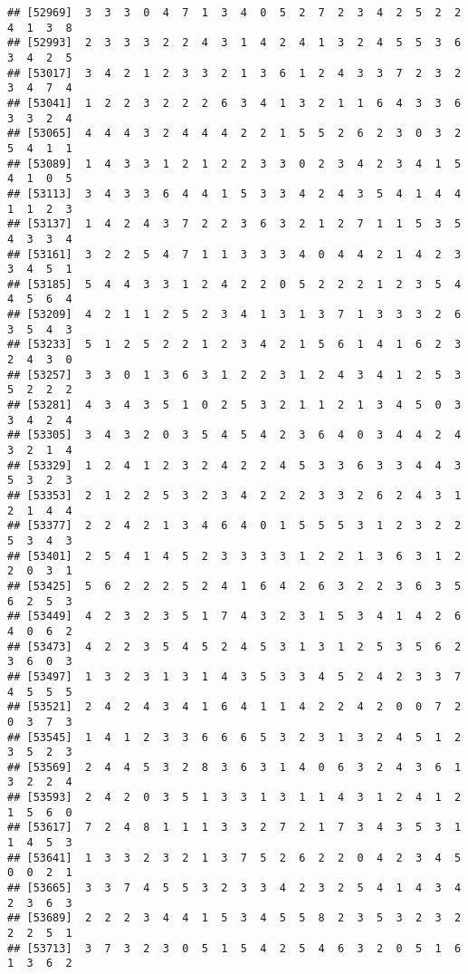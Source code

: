 \documentclass[
]{article}
\begin{document}
\begin{verbatim}
## [52969]  3  3  3  0  4  7  1  3  4  0  5  2  7  2  3  4  2  5  2  2  4  1  3  8
## [52993]  2  3  3  3  2  2  4  3  1  4  2  4  1  3  2  4  5  5  3  6  3  4  2  5
## [53017]  3  4  2  1  2  3  3  2  1  3  6  1  2  4  3  3  7  2  3  2  3  4  7  4
## [53041]  1  2  2  3  2  2  2  6  3  4  1  3  2  1  1  6  4  3  3  6  3  3  2  4
## [53065]  4  4  4  3  2  4  4  4  2  2  1  5  5  2  6  2  3  0  3  2  5  4  1  1
## [53089]  1  4  3  3  1  2  1  2  2  3  3  0  2  3  4  2  3  4  1  5  4  1  0  5
## [53113]  3  4  3  3  6  4  4  1  5  3  3  4  2  4  3  5  4  1  4  4  1  1  2  3
## [53137]  1  4  2  4  3  7  2  2  3  6  3  2  1  2  7  1  1  5  3  5  4  3  3  4
## [53161]  3  2  2  5  4  7  1  1  3  3  3  4  0  4  4  2  1  4  2  3  3  4  5  1
## [53185]  5  4  4  3  3  1  2  4  2  2  0  5  2  2  2  1  2  3  5  4  4  5  6  4
## [53209]  4  2  1  1  2  5  2  3  4  1  3  1  3  7  1  3  3  3  2  6  3  5  4  3
## [53233]  5  1  2  5  2  2  1  2  3  4  2  1  5  6  1  4  1  6  2  3  2  4  3  0
## [53257]  3  3  0  1  3  6  3  1  2  2  3  1  2  4  3  4  1  2  5  3  5  2  2  2
## [53281]  4  3  4  3  5  1  0  2  5  3  2  1  1  2  1  3  4  5  0  3  3  4  2  4
## [53305]  3  4  3  2  0  3  5  4  5  4  2  3  6  4  0  3  4  4  2  4  3  2  1  4
## [53329]  1  2  4  1  2  3  2  4  2  2  4  5  3  3  6  3  3  4  4  3  5  3  2  3
## [53353]  2  1  2  2  5  3  2  3  4  2  2  2  3  3  2  6  2  4  3  1  2  1  4  4
## [53377]  2  2  4  2  1  3  4  6  4  0  1  5  5  5  3  1  2  3  2  2  5  3  4  3
## [53401]  2  5  4  1  4  5  2  3  3  3  3  1  2  2  1  3  6  3  1  2  2  0  3  1
## [53425]  5  6  2  2  2  5  2  4  1  6  4  2  6  3  2  2  3  6  3  5  6  2  5  3
## [53449]  4  2  3  2  3  5  1  7  4  3  2  3  1  5  3  4  1  4  2  6  4  0  6  2
## [53473]  4  2  2  3  5  4  5  2  4  5  3  1  3  1  2  5  3  5  6  2  3  6  0  3
## [53497]  1  3  2  3  1  3  1  4  3  5  3  3  4  5  2  4  2  3  3  7  4  5  5  5
## [53521]  2  4  2  4  3  4  1  6  4  1  1  4  2  2  4  2  0  0  7  2  0  3  7  3
## [53545]  1  4  1  2  3  3  6  6  6  5  3  2  3  1  3  2  4  5  1  2  3  5  2  3
## [53569]  2  4  4  5  3  2  8  3  6  3  1  4  0  6  3  2  4  3  6  1  3  2  2  4
## [53593]  2  4  2  0  3  5  1  3  3  1  3  1  1  4  3  1  2  4  1  2  1  5  6  0
## [53617]  7  2  4  8  1  1  1  3  3  2  7  2  1  7  3  4  3  5  3  1  1  4  5  3
## [53641]  1  3  3  2  3  2  1  3  7  5  2  6  2  2  0  4  2  3  4  5  0  0  2  1
## [53665]  3  3  7  4  5  5  3  2  3  3  4  2  3  2  5  4  1  4  3  4  2  3  6  3
## [53689]  2  2  2  3  4  4  1  5  3  4  5  5  8  2  3  5  3  2  3  2  2  2  5  1
## [53713]  3  7  3  2  3  0  5  1  5  4  2  5  4  6  3  2  0  5  1  6  1  3  6  2

\end{verbatim}
\end{document}
